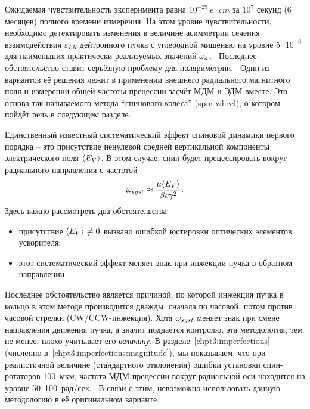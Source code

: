Ожидаемая чувствительность эксперимента равна $10^{-29}~e\cdot cm$ за $10^7$
секунд (6 месяцев) полного времени измерения. На этом уровне
чувствительности, необходимо детектировать изменения в величине 
асимметрии сечения взаимодействия $\varepsilon_{LR}$  
дейтронного пучка с углеродной мишенью на уровне 
$5\cdot10^{-6}$ для наименьших практически реализуемых значений
$\omega_a$.~\cite[стр.~18]{BNL:Deuteron2008} Последнее обстоятельство
ставит серьёзную проблему для поляриметрии.~\cite[стр.~6]{Mane:SpinWheel} Один
из вариантов её решения лежит в применении внешнего радиального
магнитного поля и измерении общей частоты прецессии засчёт МДМ и ЭДМ
вместе. Это основа так называемого метода ``спинового колеса'' (spin wheel), 
о котором пойдёт речь в следующем разделе. 

Единственный известный систематический эффект спиновой динамики
первого порядка -- это присутствие ненулевой средней вертикальной
компоненты электрического поля $\avg{E_V}$. В этом случае, спин будет
прецессировать вокруг радиального направления с частотой~\cite[стр.~11]{BNL:Deuteron2008}
\[
\w_{syst} \approx \frac{\mu\avg{E_V}}{\beta c\gamma^2}.
\]
Здесь важно рассмотреть два обстоятельства:
\begin{itemize}
\item присутствие $\avg{E_V}\neq 0$ вызвано ошибкой юстировки оптических
  элементов ускорителя;
\item этот систематический эффект меняет знак при инжекции пучка в
  обратном направлении.
\end{itemize}
Последнее обстоятельство является причиной, по которой инжекция пучка
в кольцо в этом методе производится дважды: сначала по часовой, потом
против часовой стрелки (CW/CCW-инжекция). Хотя $\omega_{syst}$ меняет знак при смене
направления движения пучка, а значит поддаётся контролю, эта методология, тем не менее,
плохо учитывает его \emph{величину}. В разделе~\ref{chpt3:imperfections} 
(численно в~\ref{chpt3:imperfections:magnitude}), мы показываем, что при реалистичной величине 
(стандартного отклонения) ошибки установки спин-ротаторов 100~мкм, 
частота МДМ прецессии вокруг радиальной оси находится на уровне 50--100~рад/сек.~\cite{Senichev:FDM} 
В связи с этим, невозможно использовать данную методологию в её оригинальном варианте.